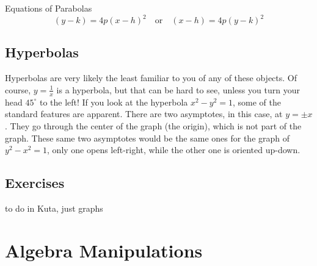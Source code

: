 \begin{derivation}{Equations of Parabolas}
\begin{equation}
(y-k) = 4p(x-h)^2 \quad  \text{or} \quad (x-h) = 4p (y-k)^2
\end{equation}
\end{derivation}

\subsection{Hyperbolas}
Hyperbolas are very likely the least familiar to you of any of these objects.  Of course, 
$y=\frac{1}{x}$ is a hyperbola, but that can be hard to see, unless you turn your head
$45^\circ$ to the left!  If you look at the hyperbola $x^2-y^2=1$, some of the standard 
features are apparent.  There are two asymptotes, in this case, at $y=\pm x$.  They 
go through the center of the graph (the origin), which is not part of the graph.  These
same two asymptotes would be the same ones for the graph of $y^2-x^2=1$, only
one opens left-right, while the other one is oriented up-down.


\subsection{Exercises}
to do in Kuta, just graphs


\newpage
\section{Algebra Manipulations}
\noindent{}
